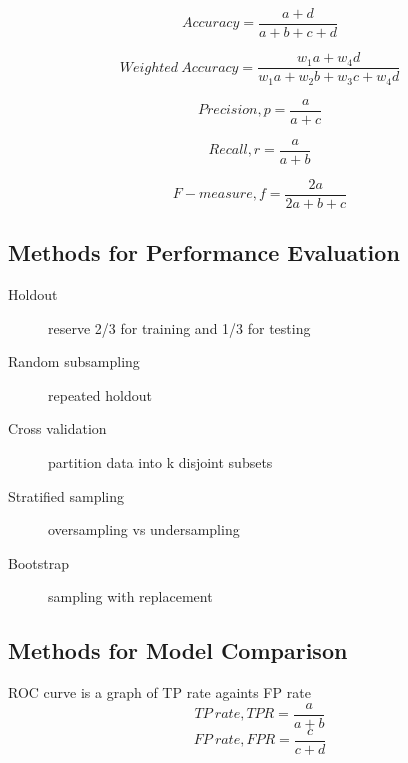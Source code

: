 $$Accuracy=\frac{a + d}{a + b + c + d}$$

$$Weighted\ Accuracy=\frac{w_1a + w_4d}{w_1a + w_2b + w_3c + w_4d}$$

$$Precision,p=\frac{a}{a + c}$$

$$Recall,r=\frac{a}{a+b}$$

$$F-measure,f=\frac{2a}{2a + b + c}$$

\subsection{Methods for Performance Evaluation}
\begin{description}
\item[Holdout] reserve 2/3 for training and 1/3 for testing
\item[Random subsampling] repeated holdout
\item[Cross validation] partition data into k disjoint subsets
\item[Stratified sampling] oversampling vs undersampling
\item[Bootstrap] sampling with replacement
\end{description}

\subsection{Methods for Model Comparison}
ROC curve is a graph of TP rate againts FP rate
$$TP\ rate, TPR = \frac{a}{a+b}$$
$$FP\ rate, FPR = \frac{c}{c + d}$$


